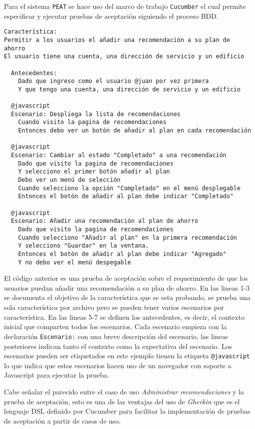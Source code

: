 Para el sistema \texttt{PEAT} se hace uso del marco de trabajo \texttt{Cucumber}
el cual permite especificar y ejecutar pruebas de aceptación siguiendo el proceso
BDD.

\begin{lstlisting}
Característica:
Permitir a los usuarios el añadir una recomendación a su plan de ahorro
El usuario tiene una cuenta, una dirección de servicio y un edificio

  Antecedentes:
    Dado que ingreso como el usuario @juan por vez primera
    Y que tengo una cuenta, una dirección de servicio y un edificio

  @javascript
  Escenario: Despliega la lista de recomendaciones
    Cuando visito la pagina de recomendaciones
    Entonces debo ver un botón de añadir al plan en cada recomendación

  @javascript
  Escenario: Cambiar al estado "Completado" a una recomendación
    Dado que visito la pagina de recomendaciones
    Y selecciono el primer botón añadir al plan
    Debo ver un menú de selección
    Cuando selecciono la opción "Completado" en el menú desplegable
    Entonces el botón de añadir al plan debe indicar "Completado"

  @javascript
  Escenario: Añadir una recomendación al plan de ahorro
    Dado que visito la pagina de recomendaciones
    Cuando selecciono "Añadir al plan" en la primera recomendación
    Y selecciono "Guardar" en la ventana.
    Entonces el botón de añadir al plan debe indicar "Agregado"
    Y no debo ver el menú despegable
\end{lstlisting}

El código anterior es una prueba de aceptación sobre el requerimiento de que los
usuarios puedan añadir una recomendación a su plan de ahorro.
En las lineas 1-3 se documenta el objetivo de la característica que se esta
probando, se prueba una sola característica por archivo pero se pueden tener
varios escenarios por característica. En las lineas 5-7 se definen
los antecedentes, es decir, el contexto inicial que comparten todos los
escenarios. Cada escenario empieza con la declaración \texttt{Escenario:}
con una breve descripción del escenario, las lineas posteriores indican
tanto el contexto como la expectativa del escenario. Los escenarios
pueden ser etiquetados en este ejemplo tienen la etiqueta \texttt{@javascript}
lo que indica que estos escenarios hacen uso de un navegador con soporte
a Javascript para ejecutar la prueba.

Cabe señalar el parecido entre el caso de uso \textit{Administrar recomendaciones}
y la prueba de aceptación, esto es una de las ventajas del uso de \textit{Gherkin}
que es el lenguaje DSL definido por Cucumber para facilitar la implementación
de pruebas de aceptación a partir de casos de uso.

